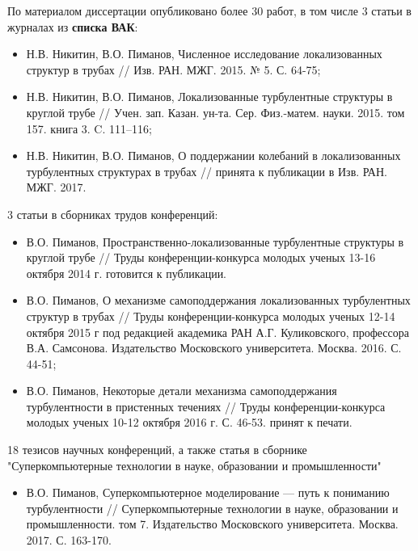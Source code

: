 По материалом диссертации опубликовано более 30 работ, в том числе 3 статьи в журналах из {\bf списка ВАК}:
\begin{itemize}
\item Н.В. Никитин, В.О. Пиманов, Численное исследование локализованных структур в трубах // Изв. РАН. МЖГ. 2015. № 5. С. 64-75;
\item Н.В. Никитин, В.О. Пиманов, Локализованные турбулентные структуры в круглой трубе // Учен.  зап.  Казан.  ун-та.  Сер.  Физ.-матем.  науки. 2015. том 157. книга 3. C. 111–116;
\item Н.В. Никитин, В.О. Пиманов, О поддержании колебаний в локализованных турбулентных структурах в трубах // принята к публикации в Изв. РАН. МЖГ. 2017. 
\end{itemize}
3 статьи в сборниках трудов конференций:
\begin{itemize}
\item В.О. Пиманов, Пространственно-локализованные турбулентные структуры в круглой трубе // Труды конференции-конкурса молодых ученых 13-16 октября 2014 г. готовится к публикации. 
\item В.О. Пиманов, О механизме самоподдержания локализованных турбулентных структур в трубах // Труды конференции-конкурса молодых ученых 12-14 октября 2015 г под редакцией академика РАН А.Г. Куликовского, профессора В.А. Самсонова. Издательство Московского университета. Москва. 2016. С. 44-51; 
\item В.О. Пиманов, Некоторые детали механизма самоподдержания турбулентности в пристенных течениях // Труды конференции-конкурса молодых ученых 10-12 октября 2016 г. С. 46-53. принят к печати. 
\end{itemize}
18 тезисов научных конференций, а также статья в сборнике "Суперкомпьютерные технологии в науке, образовании и промышленности"
\begin{itemize}
\item В.О. Пиманов, Суперкомпьютерное моделирование --- путь к пониманию турбулентности // Суперкомпьютерные технологии в науке, образовании и промышленности. том 7. Издательство Московского университета. Москва. 2017. С.  163-170. 
\end{itemize}


